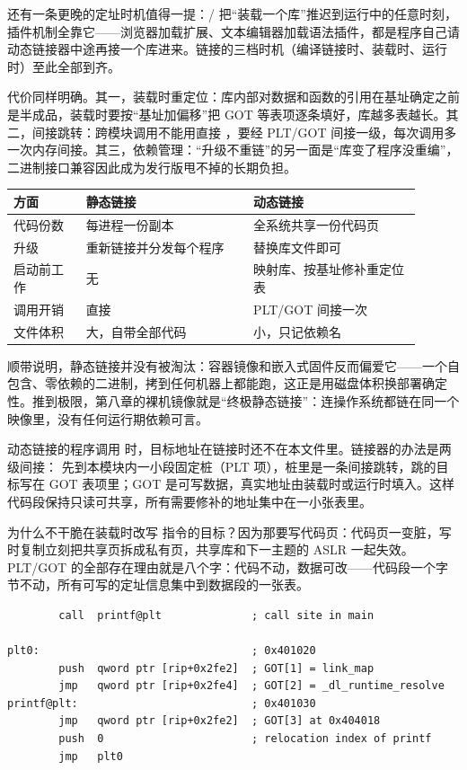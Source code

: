 还有一条更晚的定址时机值得一提：/ 把“装载一个库”推迟到运行中的任意时刻，插件机制全靠它——浏览器加载扩展、文本编辑器加载语法插件，都是程序自己请动态链接器中途再接一个库进来。链接的三档时机（编译链接时、装载时、运行时）至此全部到齐。

代价同样明确。其一，装载时重定位：库内部对数据和函数的引用在基址确定之前是半成品，装载时要按“基址加偏移”把 GOT 等表项逐条填好，库越多表越长。其二，间接跳转：跨模块调用不能用直接 ，要经 PLT/GOT 间接一级，每次调用多一次内存间接。其三，依赖管理：“升级不重链”的另一面是“库变了程序没重编”，二进制接口兼容因此成为发行版甩不掉的长期负担。

\begin{longtable}{L{0.16\linewidth}L{0.37\linewidth}L{0.37\linewidth}}
\toprule
方面 & 静态链接 & 动态链接 \\
\midrule
代码份数 & 每进程一份副本 & 全系统共享一份代码页 \\
升级 & 重新链接并分发每个程序 & 替换库文件即可 \\
启动前工作 & 无 & 映射库、按基址修补重定位表 \\
调用开销 & 直接  & PLT/GOT 间接一次 \\
文件体积 & 大，自带全部代码 & 小，只记依赖名 \\
\bottomrule
\end{longtable}

顺带说明，静态链接并没有被淘汰：容器镜像和嵌入式固件反而偏爱它——一个自包含、零依赖的二进制，拷到任何机器上都能跑，这正是用磁盘体积换部署确定性。推到极限，第八章的裸机镜像就是“终极静态链接”：连操作系统都链在同一个映像里，没有任何运行期依赖可言。

动态链接的程序调用  时，目标地址在链接时还不在本文件里。链接器的办法是两级间接： 先到本模块内一小段固定桩（PLT 项），桩里是一条间接跳转，跳的目标写在 GOT 表项里；GOT 是可写数据，真实地址由装载时或运行时填入。这样代码段保持只读可共享，所有需要修补的地址集中在一小张表里。

为什么不干脆在装载时改写  指令的目标？因为那要写代码页：代码页一变脏，写时复制立刻把共享页拆成私有页，共享库和下一主题的 ASLR 一起失效。PLT/GOT 的全部存在理由就是八个字：代码不动，数据可改——代码段一个字节不动，所有可写的定址信息集中到数据段的一张表。

\begin{lstlisting}
        call  printf@plt              ; call site in main

plt0:                                 ; 0x401020
        push  qword ptr [rip+0x2fe2]  ; GOT[1] = link_map
        jmp   qword ptr [rip+0x2fe4]  ; GOT[2] = _dl_runtime_resolve
printf@plt:                           ; 0x401030
        jmp   qword ptr [rip+0x2fe2]  ; GOT[3] at 0x404018
        push  0                       ; relocation index of printf
        jmp   plt0
\end{lstlisting}

